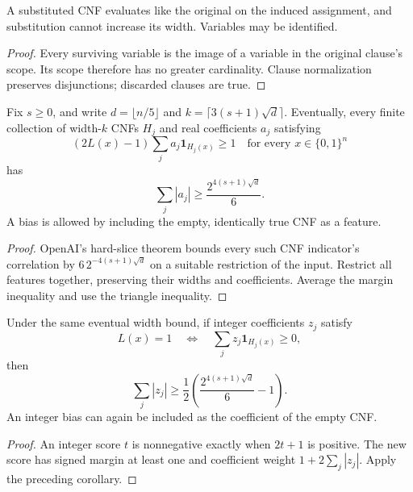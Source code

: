 \begin{theorem}
  \label{thm:circuits-openai-cnf-substitution}
  \leanok
  A substituted CNF evaluates like the original on the induced assignment,
  and substitution cannot increase its width. Variables may be identified.
\end{theorem}
\begin{proof}
  \leanok
  Every surviving variable is the image of a variable in the original
  clause's scope. Its scope therefore has no greater cardinality.
  Clause normalization preserves disjunctions; discarded clauses are true.
\end{proof}

\begin{corollary}
  \label{cor:circuits-openai-threshold-weight}
  \leanok
  Fix $s\ge0$, and write $d=\lfloor n/5\rfloor$ and
  $k=\lceil3(s+1)\sqrt d\rceil$. Eventually, every finite collection of
  width-$k$ CNFs $H_j$ and real coefficients $a_j$ satisfying
  \[
    (2L(x)-1)\sum_j a_j\mathbf1_{H_j(x)}\ge1
    \quad\text{for every }x\in\{0,1\}^n
  \]
  has
  \[
    \sum_j|a_j|\ge \frac{2^{4(s+1)\sqrt d}}{6}.
  \]
  A bias is allowed by including the empty, identically true CNF as a feature.
\end{corollary}
\begin{proof}
  \leanok
  OpenAI's hard-slice theorem bounds every such CNF indicator's correlation
  by $6\,2^{-4(s+1)\sqrt d}$ on a suitable restriction of the input.
  Restrict all features together, preserving their widths and coefficients.
  Average the margin inequality and use the triangle inequality.
\end{proof}

\begin{corollary}
  \label{cor:circuits-openai-integer-threshold-weight}
  \leanok
  Under the same eventual width bound, if integer coefficients $z_j$ satisfy
  \[
    L(x)=1\quad\Longleftrightarrow\quad
      \sum_jz_j\mathbf1_{H_j(x)}\ge0,
  \]
  then
  \[
    \sum_j|z_j|\ge
      \frac12\left(\frac{2^{4(s+1)\sqrt d}}6-1\right).
  \]
  An integer bias can again be included as the coefficient of the empty CNF.
\end{corollary}
\begin{proof}
  \leanok
  An integer score $t$ is nonnegative exactly when $2t+1$ is positive.
  The new score has signed margin at least one and coefficient weight
  $1+2\sum_j|z_j|$. Apply the preceding corollary.
\end{proof}

